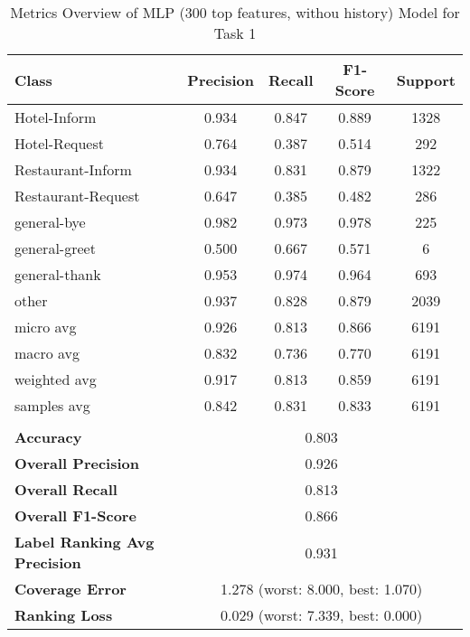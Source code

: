 
\begin{table}[h]
\centering

\begin{tabular}{|l|c|c|c|c|}
\hline
\textbf{Class}& \textbf{Precision} & \textbf{Recall} & \textbf{F1-Score} & \textbf{Support} \\ \hline
Hotel-Inform & 0.934 & 0.847 & 0.889 & 1328 \\ \hline
Hotel-Request & 0.764 & 0.387 & 0.514 & 292 \\ \hline
Restaurant-Inform & 0.934 & 0.831 & 0.879 & 1322 \\ \hline
Restaurant-Request & 0.647 & 0.385 & 0.482 & 286 \\ \hline
general-bye & 0.982 & 0.973 & 0.978 & 225 \\ \hline
general-greet & 0.500 & 0.667 & 0.571 & 6 \\ \hline
general-thank & 0.953 & 0.974 & 0.964 & 693 \\ \hline
other & 0.937 & 0.828 & 0.879 & 2039 \\ \hline\hline
micro avg & 0.926 & 0.813 & 0.866 & 6191 \\ \hline
macro avg & 0.832 & 0.736 & 0.770 & 6191 \\ \hline
weighted avg & 0.917 & 0.813 & 0.859 & 6191 \\ \hline
samples avg & 0.842 & 0.831 & 0.833 & 6191 \\ \hline
\multicolumn{5}{c}{}\\ \hline

\textbf{Accuracy}                    & \multicolumn{4}{c|}{0.803}                                 \\ \hline
\textbf{Overall Precision}           & \multicolumn{4}{c|}{0.926}                                \\ \hline
\textbf{Overall Recall}              & \multicolumn{4}{c|}{0.813}                                   \\ \hline
\textbf{Overall F1-Score}            & \multicolumn{4}{c|}{0.866}                                  \\ \hline
\textbf{Label Ranking Avg Precision} & \multicolumn{4}{c|}{0.931}                                    \\ \hline
\textbf{Coverage Error}              & \multicolumn{4}{c|}{1.278 (worst: 8.000, best: 1.070)}                             \\ \hline
\textbf{Ranking Loss}                & \multicolumn{4}{c|}{0.029 (worst: 7.339, best: 0.000)}                             \\ \hline
\end{tabular}

\caption{Metrics Overview of MLP (300 top features, withou history) Model for Task 1}
\label{table:MLP (300 top features, withou history)_metrics_task_1}
\end{table}
    